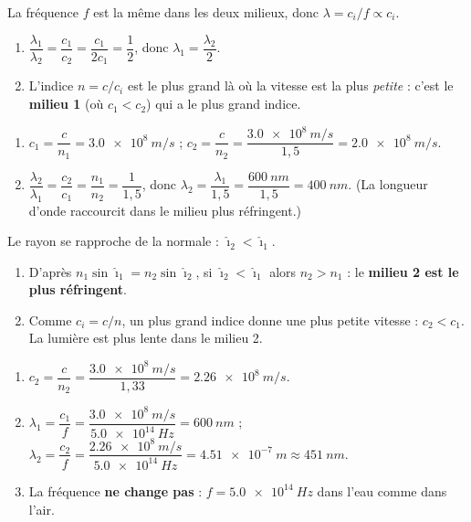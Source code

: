 \documentclass[11pt,a4paper]{article}
\begin{document}
\begin{corrige}
La fréquence $f$ est la même dans les deux milieux, donc $\lambda=c_i/f\propto c_i$.
\begin{enumerate}[label=\alph*)]
  \item $\dfrac{\lambda_1}{\lambda_2}=\dfrac{c_1}{c_2}=\dfrac{c_1}{2c_1}=\dfrac12$, donc
        $\boxed{\lambda_1=\dfrac{\lambda_2}{2}}$.
  \item L'indice $n=c/c_i$ est le plus grand là où la vitesse est la plus \emph{petite} : c'est le
        \textbf{milieu 1} (où $c_1<c_2$) qui a le plus grand indice.
\end{enumerate}
\end{corrige}

\begin{corrige}
\begin{enumerate}[label=\alph*)]
  \item $c_1=\dfrac{c}{n_1}=\qty{3.0e8}{m/s}$ ; $c_2=\dfrac{c}{n_2}=\dfrac{\qty{3.0e8}{m/s}}{1{,}5}
        =\qty{2.0e8}{m/s}$.
  \item $\dfrac{\lambda_2}{\lambda_1}=\dfrac{c_2}{c_1}=\dfrac{n_1}{n_2}=\dfrac{1}{1{,}5}$, donc
        $\lambda_2=\dfrac{\lambda_1}{1{,}5}=\dfrac{\qty{600}{nm}}{1{,}5}=\qty{400}{nm}$.
        (La longueur d'onde raccourcit dans le milieu plus réfringent.)
\end{enumerate}
\end{corrige}

\begin{corrige}
Le rayon se rapproche de la normale : $\hat{\imath}_2<\hat{\imath}_1$.
\begin{enumerate}[label=\alph*)]
  \item D'après $n_1\sin\hat{\imath}_1=n_2\sin\hat{\imath}_2$, si $\hat{\imath}_2<\hat{\imath}_1$ alors
        $n_2>n_1$ : le \textbf{milieu 2 est le plus réfringent}.
  \item Comme $c_i=c/n$, un plus grand indice donne une plus petite vitesse :
        $\boxed{c_2<c_1}$. La lumière est plus lente dans le milieu 2.
\end{enumerate}
\end{corrige}

\begin{corrige}
\begin{enumerate}[label=\alph*)]
  \item $c_2=\dfrac{c}{n_2}=\dfrac{\qty{3.0e8}{m/s}}{1{,}33}=\qty{2.26e8}{m/s}$.
  \item $\lambda_1=\dfrac{c_1}{f}=\dfrac{\qty{3.0e8}{m/s}}{\qty{5.0e14}{Hz}}=\qty{600}{nm}$ ;
        $\lambda_2=\dfrac{c_2}{f}=\dfrac{\qty{2.26e8}{m/s}}{\qty{5.0e14}{Hz}}=\qty{4.51e-7}{m}
        \approx\qty{451}{nm}$.
  \item La fréquence \textbf{ne change pas} : $f=\qty{5.0e14}{Hz}$ dans l'eau comme dans l'air.
\end{enumerate}
\end{corrige}
\end{document}
